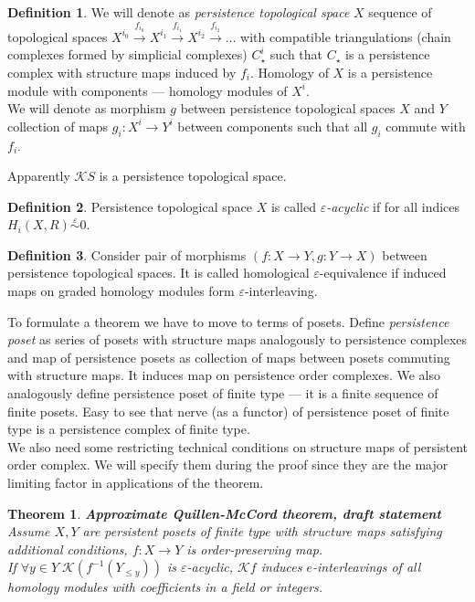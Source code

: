 \documentclass[a4paper, 12pt]{article}
\newtheorem{theorem}{Theorem}
\theoremstyle{definition}
\newtheorem{definition}{Definition}
\theoremstyle{remark}
\newcommand{\define}[1]{{\textit{#1}}}
\begin{document}
\begin{definition}
  We will denote as \define{persistence topological space} $X$ sequence of topological spaces $X^{i_0} \xrightarrow{f_{i_0}} X^{i_1} \xrightarrow{f_{i_1}} X^{i_2} \xrightarrow{f_{i_2}} \ldots$ with compatible triangulations (chain complexes formed by simplicial complexes) $C_{\star}^{i}$ such that $C_{\star}$ is a persistence complex with structure maps induced by $f_i$. Homology of $X$ is a persistence module with components --- homology modules of $X^i$.\\

  We will denote as morphism $g$ between persistence topological spaces $X$ and $Y$ collection of maps $g_i : X^i \to Y^i$ between components such that all $g_i$ commute with $f_i$.
\end{definition}

Apparently $\mathcal{K}S$ is a persistence topological space.\\

\begin{definition}
  Persistence topological space $X$ is called \define{$\varepsilon$-acyclic} if for all indices $H_i(X,R) \stackrel{\varepsilon}{\sim} 0$.
\end{definition}

\begin{definition}
  Consider pair of morphisms $(f : X \to Y, g : Y \to X)$ between persistence topological spaces. It is called homological $\varepsilon$-equivalence if induced maps on graded homology modules form $\varepsilon$-interleaving.
\end{definition}

To formulate a theorem we have to move to terms of posets. Define \define{persistence poset} as series of posets with structure maps analogously to persistence complexes and map of persistence posets as collection of maps between posets commuting with structure maps. It induces map on persistence order complexes. We also analogously define persistence poset of finite type --- it is a finite sequence of finite posets. Easy to see that nerve (as a functor) of persistence poset of finite type is a persistence complex of finite type.\\
We also need some restricting technical conditions on structure maps of persistent order complex. We will specify them during the proof since they are the major limiting factor in applications of the theorem.

\begin{theorem} \textbf{Approximate Quillen-McCord theorem, draft statement}\\
  Assume $X, Y$ are persistent posets of finite type with structure maps satisfying additional conditions, $f : X \to Y$ is order-preserving map.\\
  If $\forall y \in Y\;\mathcal{K}(f^{-1}(Y_{\leqslant y}))$ is $\varepsilon$-acyclic, $\mathcal{K}f$ induces $e$-interleavings of all homology modules with coefficients in a field or integers.\\
\end{theorem}
\end{document}
